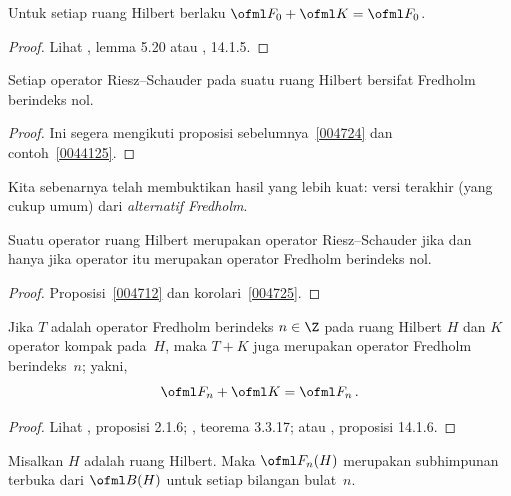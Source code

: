 \begin{prop}\label{004724} Untuk setiap ruang Hilbert berlaku $\ofml F_0 + \ofml K = \ofml F_0$.
\end{prop}

\begin{proof} Lihat \cite{Douglas:1972}, lemma 5.20 atau \cite{Wegge-Olsen:1993}, 14.1.5. \ns
\end{proof}

\begin{cor}\label{004725}
Setiap operator Riesz--Schauder pada suatu ruang Hilbert bersifat Fredholm berindeks nol.
\end{cor}

\begin{proof} Ini segera mengikuti proposisi sebelumnya~\ref{004724} dan
contoh~\ref{0044125}.
\end{proof}

Kita sebenarnya telah membuktikan hasil yang lebih kuat: versi terakhir (yang cukup umum) dari
\emph{alternatif Fredholm}.

\begin{cor}\label{0047253} Suatu operator ruang Hilbert merupakan operator
Riesz--Schauder jika dan hanya jika operator itu merupakan operator Fredholm berindeks nol.
\end{cor}

\begin{proof} Proposisi~\ref{004712} dan korolari~\ref{004725}.
\end{proof}

\begin{prop} Jika $T$ adalah operator Fredholm berindeks $n \in \Z$ pada ruang Hilbert $H$
dan $K$ operator kompak pada~$H$, maka $T + K$ juga merupakan operator Fredholm berindeks~$n$; yakni,
  \[ \ofml F_n + \ofml K = \ofml F_n\,. \]
\end{prop}

\begin{proof} Lihat \cite{HigsonR:2000}, proposisi 2.1.6; \cite{Pedersen:1995}, teorema
3.3.17; atau \cite{Wegge-Olsen:1993}, proposisi 14.1.6. \ns
\end{proof}

\begin{prop} Misalkan $H$ adalah ruang Hilbert. Maka $\ofml F_n(H)$ merupakan subhimpunan terbuka dari $\ofml B(H)$
untuk setiap bilangan bulat~$n$.
\end{prop}


